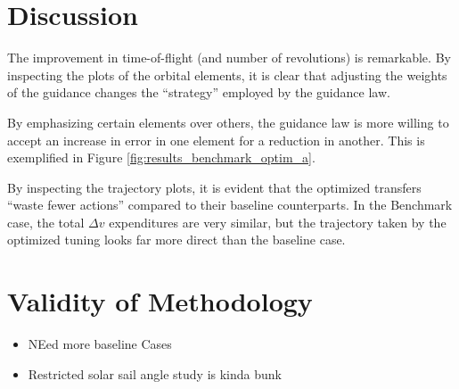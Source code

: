 \section{Discussion}

The improvement in time-of-flight (and number of revolutions) is remarkable. By inspecting the plots of the orbital elements, it is clear that adjusting the weights of the guidance changes the ``strategy'' employed by the guidance law.

By emphasizing certain elements over others, the guidance law is more willing to accept an increase in error in one element for a reduction in another. This is exemplified in Figure \ref{fig:results_benchmark_optim_a}.

By inspecting the trajectory plots, it is evident that the optimized transfers ``waste fewer actions'' compared to their baseline counterparts. In the Benchmark case, the total \(\Delta v\) expenditures are very similar, but the trajectory taken by the optimized tuning looks far more direct than the baseline case.




\section{Validity of Methodology}

\begin{itemize}
  \item NEed more baseline Cases
  \item Restricted solar sail angle study is kinda bunk
\end{itemize}